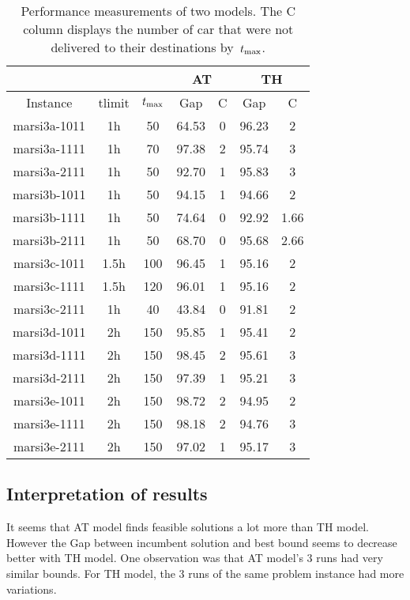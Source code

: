 \begin{table}[h]
    \begin{center}
        \begin{tabular}{|c|c|c|c|c|c|c|}
            \cline{4-7}
            \multicolumn{3}{l}{\ } & \multicolumn{2}{|c|}{AT} &
            \multicolumn{2}{|c|}{TH}\\
            \hline
            Instance & tlimit & $t_{\max}$ & Gap & C & Gap & C\\
            \hline
            marsi3a-1011 & 1h & 50 & 64.53 & 0 & 96.23 & 2\\
            marsi3a-1111 & 1h & 70 & 97.38 & 2 & 95.74 & 3\\
            marsi3a-2111 & 1h & 50 & 92.70 & 1 & 95.83 & 3\\
            marsi3b-1011 & 1h & 50 & 94.15 & 1 & 94.66 & 2\\
            marsi3b-1111 & 1h & 50 & 74.64 & 0 & 92.92 & 1.66\\
            marsi3b-2111 & 1h & 50 & 68.70 & 0 & 95.68 & 2.66\\
            marsi3c-1011 & 1.5h & 100 & 96.45 & 1 & 95.16 & 2\\
            marsi3c-1111 & 1.5h & 120 & 96.01 & 1 & 95.16 & 2\\
            marsi3c-2111 & 1h & 40 & 43.84 & 0 & 91.81 & 2\\
            marsi3d-1011 & 2h & 150 & 95.85 & 1 & 95.41 & 2\\
            marsi3d-1111 & 2h & 150 & 98.45 & 2 & 95.61 & 3\\
            marsi3d-2111 & 2h & 150 & 97.39 & 1 & 95.21 & 3\\
            marsi3e-1011 & 2h & 150 & 98.72 & 2 & 94.95 & 2\\
            marsi3e-1111 & 2h & 150 & 98.18 & 2 & 94.76 & 3\\
            marsi3e-2111 & 2h & 150 & 97.02 & 1 & 95.17 & 3\\
            \hline
        \end{tabular}
        \caption{Performance measurements of two models. The C column displays
            the number of car that were not delivered to their destinations
        by~$t_{\max}$.}
        \label{tbl:compare}
    \end{center}
\end{table}

\subsection{Interpretation of results}
It seems that AT model finds feasible solutions a lot more than TH model.
However the Gap between incumbent solution and best bound seems to decrease
better with TH model. One observation was that AT model's 3 runs had very
similar bounds. For TH model, the 3 runs of the same problem instance had more
variations.

